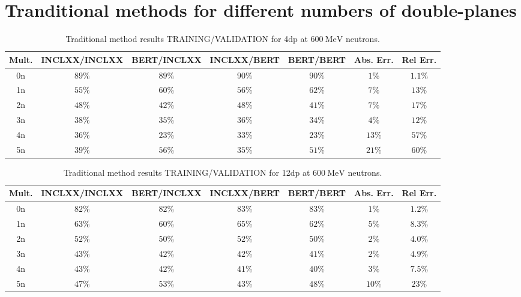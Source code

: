 \documentclass[10pt,a4paper]{report}
\newcommand{\MeV}[0]{\ \textrm{MeV}}
\begin{document}

\FloatBarrier
\section{Tranditional methods for different numbers of double-planes}
\label{sec:tradmed_dp} 

\begin{table}[htbp]
\centering
\caption{Traditional method results TRAINING/VALIDATION for \textrm{4dp} at ${600 \MeV}$ neutrons.}
\label{tab:4dp600}
\begin{tabular}{| c | c c c c | c c |}
\hline
Mult. & INCLXX/INCLXX & BERT/INCLXX & INCLXX/BERT & BERT/BERT & Abs. Err. & Rel Err.   \\
\hline
0n    & ${89 \%}$     & ${89 \%}$   & ${90 \%}$   & ${90 \%}$ & ${1 \%}$  & ${1.1 \%}$ \\
1n    & ${55 \%}$     & ${60 \%}$   & ${56 \%}$   & ${62 \%}$ & ${7 \%}$  & ${13 \%}$  \\
2n    & ${48 \%}$     & ${42 \%}$   & ${48 \%}$   & ${41 \%}$ & ${7 \%}$  & ${17 \%}$  \\
3n    & ${38 \%}$     & ${35 \%}$   & ${36 \%}$   & ${34 \%}$ & ${4 \%}$  & ${12 \%}$  \\
4n    & ${36 \%}$     & ${23 \%}$   & ${33 \%}$   & ${23 \%}$ & ${13 \%}$ & ${57 \%}$  \\
5n    & ${39 \%}$     & ${56 \%}$   & ${35 \%}$   & ${51 \%}$ & ${21 \%}$ & ${60 \%}$  \\
\hline
\end{tabular}
\end{table}

\begin{table}[htbp]
\centering
\caption{Traditional method results TRAINING/VALIDATION for \textrm{12dp} at ${600 \MeV}$ neutrons.}
\label{tab:12dp600}
\begin{tabular}{| c | c c c c | c c |}
\hline
Mult. & INCLXX/INCLXX & BERT/INCLXX & INCLXX/BERT & BERT/BERT & Abs. Err. & Rel Err.   \\
\hline
0n    & ${82 \%}$     & ${82 \%}$   & ${83 \%}$   & ${83 \%}$ & ${1 \%}$  & ${1.2 \%}$ \\
1n    & ${63 \%}$     & ${60 \%}$   & ${65 \%}$   & ${62 \%}$ & ${5 \%}$  & ${8.3 \%}$ \\
2n    & ${52 \%}$     & ${50 \%}$   & ${52 \%}$   & ${50 \%}$ & ${2 \%}$  & ${4.0 \%}$ \\
3n    & ${43 \%}$     & ${42 \%}$   & ${42 \%}$   & ${41 \%}$ & ${2 \%}$  & ${4.9 \%}$ \\
4n    & ${43 \%}$     & ${42 \%}$   & ${41 \%}$   & ${40 \%}$ & ${3 \%}$  & ${7.5 \%}$ \\ 
5n    & ${47 \%}$     & ${53 \%}$   & ${43 \%}$   & ${48 \%}$ & ${10 \%}$ & ${23 \%}$  \\
\hline
\end{tabular}
\end{table}
\end{document}
